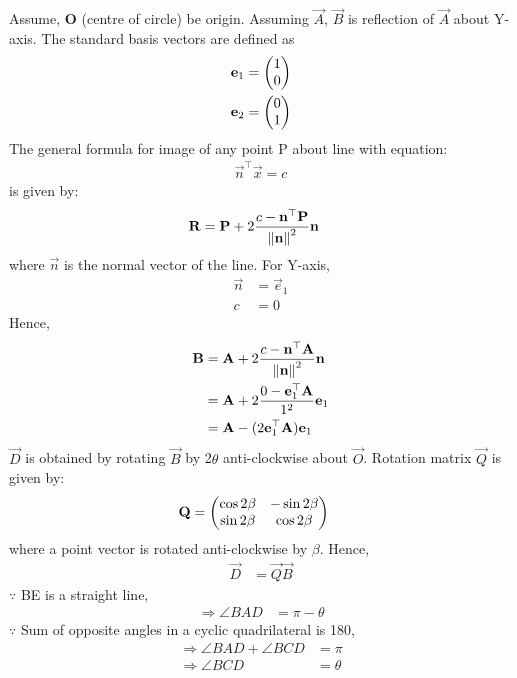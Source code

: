 \documentclass[journal,12pt,twocolumn]{IEEEtran}
\begin{document}
Assume, \textbf{O} (centre of circle) be origin.
Assuming $\vec{A}$, $\vec{B}$ is reflection of $\vec{A}$ about Y-axis.
The standard basis vectors are defined as
\begin{align}
    \mathbf{e}_1 & = \begin{pmatrix}1 \\0\end{pmatrix}\\
    \mathbf{e}_2 & = \begin{pmatrix}0 \\1\end{pmatrix}
\end{align}
The general formula for image of any point P about line with equation:
\begin{align}
    \vec{n}^{\top}\vec{x} = c
\end{align}
is given by:
\begin{align}
    \mathbf{R} & =
    \mathbf{P} + 2\frac{c - \mathbf{n}^{\top}\mathbf{P}}{\left\lVert\mathbf{n}\right\rVert^2}\mathbf{n}
\end{align}
where $\vec{n}$ is the normal vector of the line.
For Y-axis,
\begin{align}
    \vec{n} & = \vec{e}_1 \\
    c       & = 0
\end{align}
Hence,\\
\begin{align}
    \mathbf{B} & =
    \mathbf{A} + 2\frac{c - \mathbf{n}^{\top}\mathbf{A}}{\left\lVert\mathbf{n}\right\rVert^2}\mathbf{n}
    \\
            & =
    \mathbf{A} + 2\frac{0 - \mathbf{e}_1^{\top}\mathbf{A}}{1^2}\mathbf{e}_1
    \\
            & =
    \mathbf{A} - (2\mathbf{e}_1^{\top}\mathbf{A})\mathbf{e}_1
\end{align}
$\vec{D}$ is obtained by rotating $\vec{B}$ by 2$\theta$ anti-clockwise about $\vec{O}$.
Rotation matrix $\vec{Q}$ is given by:
\begin{align}
    \mathbf{Q} & = \begin{pmatrix}\cos{2\beta} & -\sin{2\beta} \\ \sin{2\beta} & \cos{2\beta}\end{pmatrix}
\end{align}
where a point vector is rotated anti-clockwise by $\beta$.
Hence,
\begin{align}
    \vec{D} & = \vec{Q}\vec{B}
\end{align}
$\because$ BE is a straight line,
\begin{align}
        \Rightarrow \angle{BAD} &= \pi - \theta
\end{align}
$\because$ Sum of opposite angles in a cyclic quadrilateral is 180\textdegree,
\begin{align}
        \Rightarrow \angle{BAD} + \angle{BCD} &= \pi \\
        \Rightarrow \angle{BCD} &= \theta
\end{align}
\end{document}
